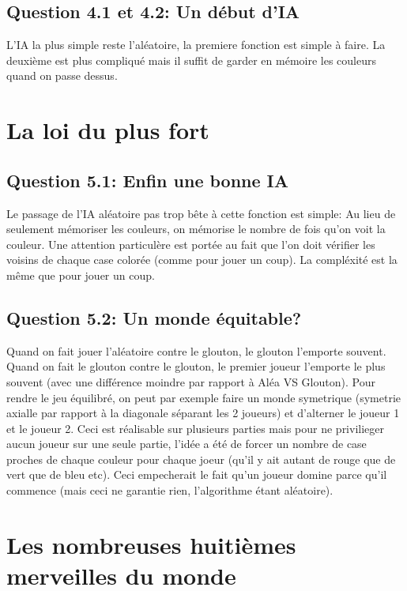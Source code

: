 \documentclass[11pt]{article}
\begin{document}
    \subsection*{Question 4.1 et 4.2: Un début d'IA}

    L'IA la plus simple reste l'aléatoire, la premiere fonction est simple à faire. La deuxième est plus compliqué mais il suffit de garder en mémoire les couleurs quand on passe dessus.

    \section{La loi du plus fort}

    \subsection*{Question 5.1: Enfin une bonne IA}

    Le passage de l'IA aléatoire pas trop bête à cette fonction est simple: Au lieu de seulement mémoriser les couleurs, on mémorise le nombre de fois qu'on voit la couleur. Une attention particulère est portée au fait que l'on doit vérifier les voisins de chaque case colorée (comme pour jouer un coup). La compléxité est la même que pour jouer un coup.

    \subsection*{Question 5.2: Un monde équitable?}

    Quand on fait jouer l'aléatoire contre le glouton, le glouton l'emporte souvent. Quand on fait le glouton contre le glouton, le premier joueur l'emporte le plus souvent (avec une différence moindre par rapport à Aléa VS Glouton). Pour rendre le jeu équilibré, on peut par exemple faire un monde symetrique (symetrie axialle par rapport à la diagonale séparant les 2 joueurs) et d'alterner le joueur 1 et le joueur 2. Ceci est réalisable sur plusieurs parties mais pour ne privilieger aucun joueur sur une seule partie, l'idée a été de forcer un nombre de case proches de chaque couleur pour chaque joeur (qu'il y ait autant de rouge que de vert que de bleu etc). Ceci empecherait le fait qu'un joueur domine parce qu'il commence (mais ceci ne garantie rien, l'algorithme étant aléatoire).

    \section{Les nombreuses huitièmes merveilles du monde}
\end{document}
